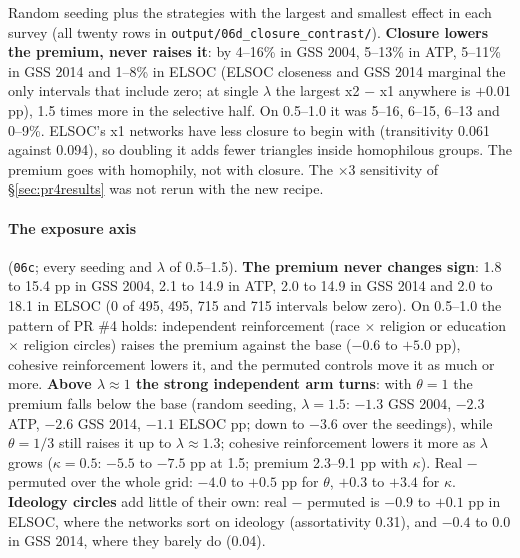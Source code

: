 \documentclass[11pt,a4paper]{article}
\newcommand{\code}[1]{\texttt{#1}}
\begin{document}
\noindent Random seeding plus the strategies with the largest and smallest effect in each survey (all
twenty rows in \code{output/06d\_closure\_contrast/}). \textbf{Closure lowers the premium, never raises it}:
by 4--16\% in GSS 2004, 5--13\% in ATP, 5--11\% in GSS 2014 and 1--8\% in ELSOC (ELSOC closeness and GSS 2014
marginal the only intervals that include zero; at single $\lambda$ the largest x2 $-$ x1 anywhere is $+0.01$ pp),
1.5 times more in the selective half. On 0.5--1.0 it was 5--16, 6--15, 6--13 and 0--9\%. ELSOC's x1 networks have less closure to begin
with (transitivity 0.061 against 0.094), so doubling it adds fewer triangles inside homophilous groups.
The premium goes with homophily, not with closure. The $\times 3$ sensitivity of \S\ref{sec:pr4results} was
not rerun with the new recipe.

\paragraph{The exposure axis} (\code{06c}; every seeding and $\lambda$ of 0.5--1.5). \textbf{The premium never
changes sign}: 1.8 to 15.4 pp in GSS 2004, 2.1 to 14.9 in ATP, 2.0 to 14.9 in GSS 2014 and 2.0 to 18.1 in ELSOC
(0 of 495, 495, 715 and 715 intervals below zero). On 0.5--1.0 the pattern of PR \#4 holds: independent
reinforcement (race $\times$ religion or education $\times$ religion circles) raises the premium against the
base ($-0.6$ to $+5.0$ pp), cohesive reinforcement lowers it, and the permuted controls move it as much or more.
\textbf{Above $\lambda \approx 1$ the strong independent arm turns}: with $\theta = 1$ the premium falls below the
base (random seeding, $\lambda = 1.5$: $-1.3$ GSS 2004, $-2.3$ ATP, $-2.6$ GSS 2014, $-1.1$ ELSOC pp; down to $-3.6$
over the seedings), while $\theta = 1/3$ still raises it up to $\lambda \approx 1.3$; cohesive reinforcement lowers
it more as $\lambda$ grows ($\kappa = 0.5$: $-5.5$ to $-7.5$ pp at 1.5; premium 2.3--9.1 pp with $\kappa$). Real $-$
permuted over the whole grid: $-4.0$ to $+0.5$ pp for $\theta$, $+0.3$ to $+3.4$ for $\kappa$. \textbf{Ideology
circles} add little of their own: real $-$ permuted is $-0.9$ to $+0.1$ pp in ELSOC, where the networks sort on
ideology (assortativity 0.31), and $-0.4$ to $0.0$ in GSS 2014, where they barely do (0.04).
\end{document}

